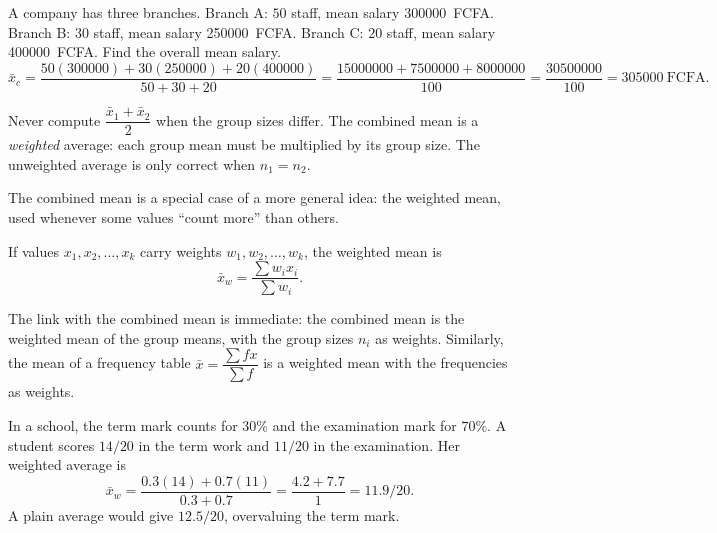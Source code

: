 \documentclass[11pt]{article}
\newcommand{\cle}[1]{{\popxbold\color{popdark}#1}}
\newcounter{popsec}
\newcounter{popsub}
\newcommand{\courssub}[1]{%
  \stepcounter{popsub}%
  \par\vspace{9pt}\noindent{\popxbold\fontsize{11.5}{13}\selectfont\color{popink}{\color{poporange}\thepopsec.\thepopsub}\hspace{6pt}#1}\par\nopagebreak\vspace{4pt}
}
\begin{document}
\begin{exoresolu}
A company has three branches. Branch A: $50$ staff, mean salary \SI{300000}{FCFA}. Branch B: $30$ staff, mean salary \SI{250000}{FCFA}. Branch C: $20$ staff, mean salary \SI{400000}{FCFA}. Find the overall mean salary.
\tcblower
\[
\bar{x}_c = \frac{50(300000) + 30(250000) + 20(400000)}{50+30+20}
= \frac{15000000 + 7500000 + 8000000}{100}
= \frac{30500000}{100}
= 305000\ \mathrm{FCFA}.
\]
\end{exoresolu}

\begin{attention}
Never compute $\dfrac{\bar{x}_1+\bar{x}_2}{2}$ when the group sizes differ. The combined mean is a \emph{weighted} average: each group mean must be multiplied by its group size. The unweighted average is only correct when $n_1=n_2$.
\end{attention}

\courssub{Weighted Mean}

The combined mean is a special case of a more general idea: the \cle{weighted mean}, used whenever some values ``count more'' than others.

\begin{definition}
If values $x_1, x_2, \dots, x_k$ carry weights $w_1, w_2, \dots, w_k$, the weighted mean is
\[
\bar{x}_w=\frac{\sum w_i x_i}{\sum w_i}.
\]
\end{definition}

The link with the combined mean is immediate: the combined mean is the weighted mean of the group means, with the group sizes $n_i$ as weights. Similarly, the mean of a frequency table $\bar{x}=\dfrac{\sum fx}{\sum f}$ is a weighted mean with the frequencies as weights.

\begin{exemplebox}
In a school, the term mark counts for $30\%$ and the examination mark for $70\%$. A student scores $14/20$ in the term work and $11/20$ in the examination. Her weighted average is
\[
\bar{x}_w=\frac{0.3(14)+0.7(11)}{0.3+0.7}=\frac{4.2+7.7}{1}=11.9/20.
\]
A plain average would give $12.5/20$, overvaluing the term mark.
\end{exemplebox}
\end{document}
